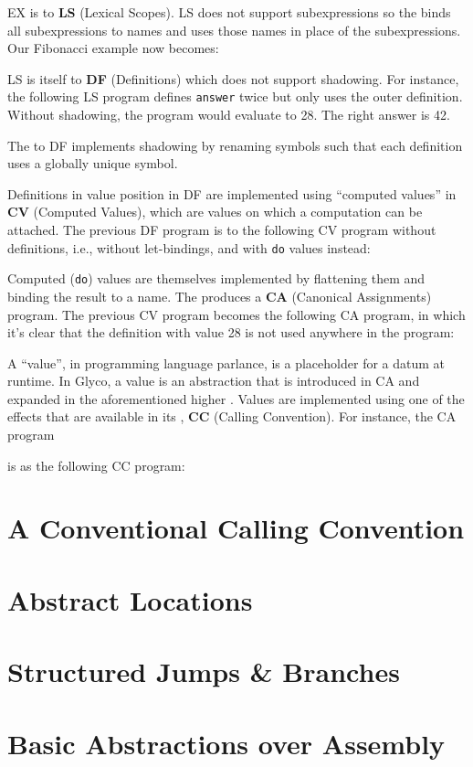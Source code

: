 \documentclass[main.tex]{subfiles}
\begin{document}
EX is \lowered{} to \textbf{LS} (Lexical Scopes). LS does not support subexpressions so the  binds all subexpressions to names and uses those names in place of the subexpressions. Our Fibonacci example now becomes:


LS is itself \lowered{} to \textbf{DF} (Definitions) which does not support shadowing. For instance, the following LS program defines \texttt{answer} twice but only uses the outer definition. Without shadowing, the program would evaluate to 28. The right answer is 42.


The  to DF implements shadowing by renaming symbols such that each definition uses a globally unique symbol.


Definitions in value position in DF are implemented using \enquote{computed values} in \textbf{CV} (Computed Values), which are values on which a computation can be attached. The previous DF program is \lowered{} to the following CV program without definitions, i.e., without let-bindings, and with \texttt{do} values instead:


Computed (\texttt{do}) values are themselves implemented by flattening them and binding the result to a name. The  produces a \textbf{CA} (Canonical Assignments) program. The previous CV program becomes the following CA program, in which it's clear that the definition with value 28 is not used anywhere in the program:


A \enquote{value}, in programming language parlance, is a placeholder for a datum at runtime. In Glyco, a value is an abstraction that is introduced in CA and expanded in the aforementioned higher . Values are implemented using one of the effects that are available in its , \textbf{CC} (Calling Convention). For instance, the CA program

is \lowered{} as the following CC program:


\section{A Conventional Calling Convention}

\section{Abstract Locations}

\section{Structured Jumps \& Branches}

\section{Basic Abstractions over Assembly}

\biblio{}
\onlyinsubfile{\glsaddall\printglossaries}
\end{document}
